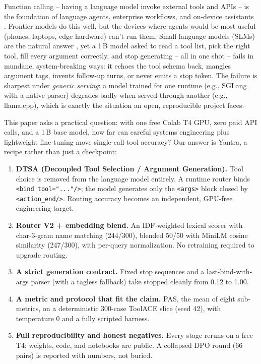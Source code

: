 \documentclass[11pt]{article}
\newcommand{\code}[1]{\texttt{#1}}
\begin{document}
Function calling -- having a language model invoke external tools and APIs -- is
the foundation of language agents, enterprise workflows, and on-device assistants
\cite{bfcl,gorilla,toolllm}. Frontier models do this well, but the devices where
agents would be most useful (phones, laptops, edge hardware) can't run them.
Small language models (SLMs) are the natural answer \cite{minicpm}, yet a 1\,B
model asked to read a tool list, pick the right tool, fill every argument
correctly, and stop generating -- all in one shot -- fails in mundane,
system-breaking ways: it echoes the tool schema back, mangles argument tags,
invents follow-up turns, or never emits a stop token. The failure is sharpest
under \emph{generic serving}: a model trained for one runtime (e.g., SGLang with
a native parser) degrades badly when served through another (e.g., llama.cpp),
which is exactly the situation an open, reproducible project faces.

This paper asks a practical question: with one free Colab T4 GPU, zero paid API
calls, and a 1\,B base model, how far can careful systems engineering plus
lightweight fine-tuning move single-call tool accuracy? Our answer is Yantra, a
recipe rather than just a checkpoint:

\begin{enumerate}
  \item \textbf{DTSA (Decoupled Tool Selection / Argument Generation).}
    Tool choice is removed from the language model entirely. A runtime
    router binds \code{<bind tool="..."/>}; the model generates only
    the \code{<args>} block closed by \code{<action\_end/>}. Routing
    accuracy becomes an independent, GPU-free engineering target.
  \item \textbf{Router V2 + embedding blend.} An IDF-weighted lexical
    scorer with char-3-gram name matching (244/300), blended 50/50
    with MiniLM cosine similarity (247/300), with per-query
    normalization. No retraining required to upgrade routing.
  \item \textbf{A strict generation contract.} Fixed stop sequences and
    a last-bind-with-args parser (with a tagless fallback) take stopped
    cleanly from 0.12 to 1.00.
  \item \textbf{A metric and protocol that fit the claim.} PAS, the mean
    of eight sub-metrics, on a deterministic 300-case ToolACE slice
    (seed 42), with temperature 0 and a fully scripted harness.
  \item \textbf{Full reproducibility and honest negatives.} Every stage
    reruns on a free T4; weights, code, and notebooks are public. A
    collapsed DPO round (66 pairs) is reported with numbers, not buried.
\end{enumerate}
\end{document}
